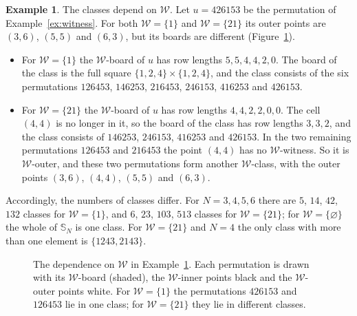 \documentclass[11pt]{amsart}
\theoremstyle{definition}
\newtheorem{example}[theorem]{Example}
\theoremstyle{remark}
\newcommand{\bS}{\mathbb{S}}
\newcommand{\cW}{\mathcal{W}}
\newcommand{\gridlines}[2]{\draw[gray!55,very thin] (0,0) grid (#1,-#2);}
\newcommand{\shaderows}[2][gray!22]{\foreach \x/\y in {#2}{\fill[#1] (0,1-\x) rectangle (\y,-\x);}}
\newcommand{\pt}[2]{\fill (#2-0.5,0.5-#1) circle (0.16);}
\newcommand{\opt}[2]{\draw[semithick,fill=white] (#2-0.5,0.5-#1) circle (0.16);}
\begin{document}
\begin{example}\label{ex:W-dependence}
The classes depend on $\cW$. Let $u=426153$ be the permutation of Example~\ref{ex:witness}. For both $\cW=\{1\}$ and $\cW=\{21\}$ its outer points are $(3,6)$, $(5,5)$ and $(6,3)$, but its boards are different (Figure~\ref{fig:W-dependence}).
\begin{itemize}
\item For $\cW=\{1\}$ the $\cW$-board of $u$ has row lengths $5,5,4,4,2,0$. The board of the class is the full square $\{1,2,4\}\times\{1,2,4\}$, and the class consists of the six permutations $126453$, $146253$, $216453$, $246153$, $416253$ and $426153$.
\item For $\cW=\{21\}$ the $\cW$-board of $u$ has row lengths $4,4,2,2,0,0$. The cell $(4,4)$ is no longer in it, so the board of the class has row lengths $3,3,2$, and the class consists of $146253$, $246153$, $416253$ and $426153$. In the two remaining permutations $126453$ and $216453$ the point $(4,4)$ has no $\cW$-witness. So it is $\cW$-outer, and these two permutations form another $\cW$-class, with the outer points $(3,6)$, $(4,4)$, $(5,5)$ and $(6,3)$.
\end{itemize}
Accordingly, the numbers of classes differ. For $N=3,4,5,6$ there are $5$, $14$, $42$, $132$ classes for $\cW=\{1\}$, and $6$, $23$, $103$, $513$ classes for $\cW=\{21\}$; for $\cW=\{\varnothing\}$ the whole of $\bS_N$ is one class. For $\cW=\{21\}$ and $N=4$ the only class with more than one element is $\{1243,2143\}$.
\end{example}

\begin{figure}[ht]
\centering
{}
\qquad
{}
\qquad
{}
\caption{The dependence on $\cW$ in Example~\ref{ex:W-dependence}. Each permutation is drawn with its $\cW$-board (shaded), the $\cW$-inner points black and the $\cW$-outer points white. For $\cW=\{1\}$ the permutations $426153$ and $126453$ lie in one class; for $\cW=\{21\}$ they lie in different classes.}\label{fig:W-dependence}
\end{figure}
\end{document}
